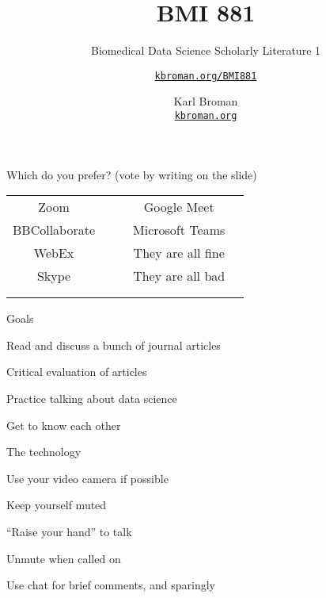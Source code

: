 \documentclass[aspectratio=169,12pt,t]{beamer}
\title{BMI 881}
\subtitle{Biomedical Data Science Scholarly Literature 1}
\author{\href{https://kbroman.org/BMI881}{\tt kbroman.org/BMI881} }
\institute{}
\date{\small \hspace{3in} Karl Broman \\
  \hspace{3in} \href{https://kbroman.org}{\color{foreground}
    \small \tt kbroman.org}}
\begin{document}
\begin{frame}[c]{Which do you prefer? {\hilit (vote by writing on the slide)}}

\renewcommand{\arraystretch}{2}
  \begin{tabular}{|c|c|c|c|c|} \cline{1-2} \cline{4-5}
    Zoom            &\hspace{1in} && Google Meet        & \hspace{1in}  \\ \cline{1-2} \cline{4-5}
    BBCollaborate   &&& Microsoft Teams                 & \\ \cline{1-2} \cline{4-5}
    WebEx           &&& They are all fine  & \\ \cline{1-2} \cline{4-5}
    Skype           &&& They are all bad   & \\ \cline{1-2} \cline{4-5}
                    &&&                    & \\ \cline{1-2} \cline{4-5}
                    &&&                    & \\ \cline{1-2} \cline{4-5}
   \end{tabular}

\end{frame}


{
\frame{
  \titlepage
} }




\begin{frame}{Goals}

  \bbi
\item Read and discuss a bunch of journal articles
\item Critical evaluation of articles
\item Practice talking about data science
\item Get to know each other
  \ei

\end{frame}




\begin{frame}{The technology}

  \bbi
\item Use your video camera if possible
\item Keep yourself muted
\item ``Raise your hand'' to talk
\item Unmute when called on
\item Use chat for brief comments, and sparingly
  \ei

\end{frame}
\end{document}
